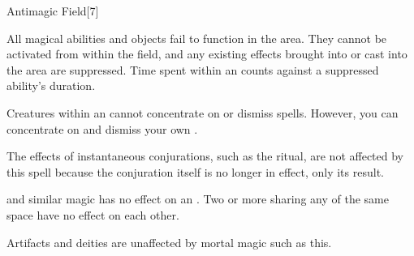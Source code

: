 \begin{spellsection}{Antimagic Field}[7]
    \begin{spellheader}
    \end{spellheader}
    \begin{spellcontent}
        \begin{spelltargetinginfo}
        \end{spelltargetinginfo}
        \begin{spelleffects}
            \spelleffect All magical abilities and objects fail to function in the area. They cannot be activated from within the field, and any existing effects brought into or cast into the area are suppressed. Time spent within an  counts against a suppressed ability's duration.
            \par Creatures within an  cannot concentrate on or dismiss spells. However, you can concentrate on and dismiss your own .
            \spelldur \durshort
        \end{spelleffects}
    \end{spellcontent}
    \begin{spellfooter}
        \spellnotes The effects of instantaneous conjurations, such as the  ritual, are not affected by this spell because the conjuration itself is no longer in effect, only its result.

        \par {} and similar magic has no effect on an . Two or more  sharing any of the same space have no effect on each other.
        \par Artifacts and deities are unaffected by mortal magic such as this.
        \miscastexplode
    \end{spellfooter}
    \begin{spellaugments}
    \end{spellaugments}
\end{spellsection}

